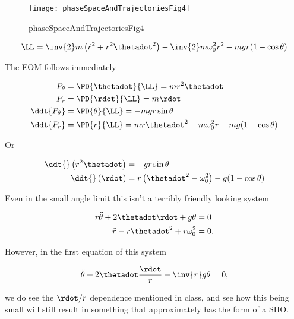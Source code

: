 \begin{figure}[htp]
   \centering
   \texttt{[image: phaseSpaceAndTrajectoriesFig4]}
   \caption{phaseSpaceAndTrajectoriesFig4}\label{fig:phaseSpaceAndTrajectories:phaseSpaceAndTrajectoriesFig4}
\end{figure}

\begin{equation}\label{eqn:phaseSpaceAndTrajectories:430}
\LL = \inv{2} m \left( \dot{r}^2 + r^2 \thetadot^2 \right) - \inv{2} m \omega_0^2 r^2 - m g r( 1 - \cos\theta)
\end{equation}

The EOM follows immediately

\begin{align}\label{eqn:phaseSpaceAndTrajectories:450}
P_\theta &= \PD{\thetadot}{\LL} = m r^2 \thetadot \\
P_r &= \PD{\rdot}{\LL} = m \rdot \\
\ddt{P_\theta} &= \PD{\theta}{\LL} = -m g r \sin\theta \\
\ddt{P_r} &= \PD{r}{\LL} = m r \thetadot^2 - m \omega_0^2 r - m g (1 - \cos\theta)
\end{align}

Or

\begin{align}\label{eqn:phaseSpaceAndTrajectories:470}
\ddt{} \left( r^2 \thetadot \right) &= - g r \sin\theta \\
\ddt{} \left( \rdot \right) &= r \left( \thetadot^2 - \omega_0^2 \right) - g (1 - \cos\theta)
\end{align}

Even in the small angle limit this isn't a terribly friendly looking system

\begin{align}\label{eqn:phaseSpaceAndTrajectories:490}
r \ddot{\theta} + 2 \thetadot \rdot + g \theta &= 0 \\
\ddot{r} - r \thetadot^2 + r \omega_0^2 &= 0.
\end{align}

However, in the first equation of this system

\begin{equation}\label{eqn:phaseSpaceAndTrajectories:510}
\ddot{\theta} + 2 \thetadot \frac{\rdot}{r} + \inv{r} g \theta = 0,
\end{equation}

we do see the $\rdot/r$ dependence mentioned in class, and see how this being small will still result in something that approximately has the form of a SHO.

\EndNoBibArticle
